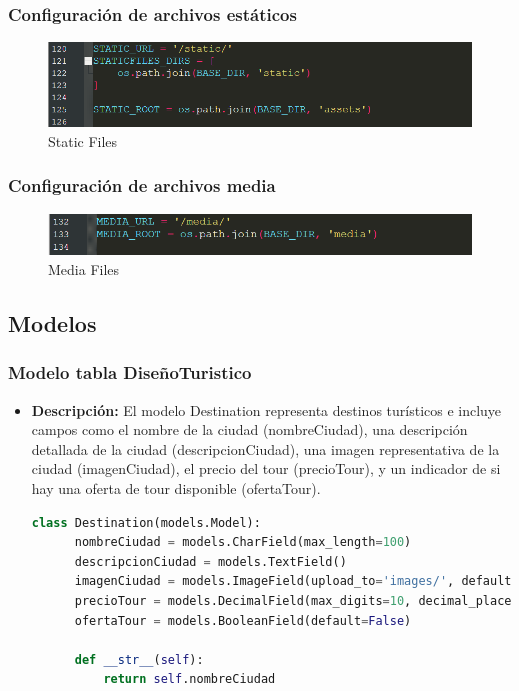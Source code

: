 \documentclass{article}
\begin{document}

  \subsubsection{Configuración de archivos estáticos}
  \begin{figure}[H]
    \centering
    \includegraphics[width=1\textwidth, keepaspectratio]{img/static.png}
    \caption{Static Files}
  \end{figure}
  

  \subsubsection{Configuración de archivos media}
  \begin{figure}[H]
    \centering
    \includegraphics[width=1\textwidth, keepaspectratio]{img/media.png}
    \caption{Media Files}
  \end{figure}
  

  \subsection{Modelos}
  

  \subsubsection{Modelo tabla DiseñoTuristico}
  \begin{itemize}
    \item \textbf{Descripción: }El modelo Destination representa destinos turísticos e incluye campos como el nombre de la ciudad 
    (nombreCiudad), una descripción detallada de la ciudad (descripcionCiudad), una imagen representativa de la ciudad (imagenCiudad), 
    el precio del tour (precioTour), y un indicador de si hay una oferta de tour disponible (ofertaTour).
    \begin{lstlisting}[language=Python, caption={Modelo Destination}]
    class Destination(models.Model):
      nombreCiudad = models.CharField(max_length=100)
      descripcionCiudad = models.TextField()
      imagenCiudad = models.ImageField(upload_to='images/', default='default_image.jpg')
      precioTour = models.DecimalField(max_digits=10, decimal_places=2)
      ofertaTour = models.BooleanField(default=False)

      def __str__(self):
          return self.nombreCiudad
    \end{lstlisting}
  \end{itemize}
  
\end{document}
